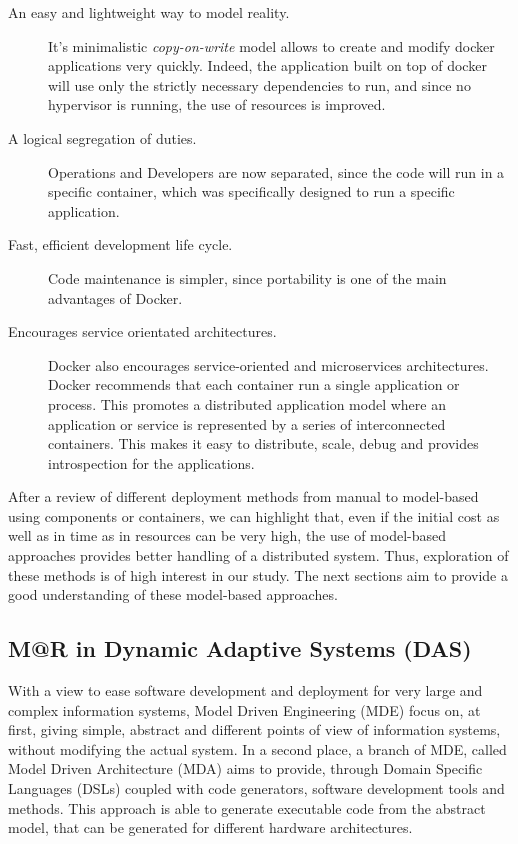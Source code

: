 \begin{description}
	\item[An easy and lightweight way to model reality.] It's minimalistic \textit{copy-on-write} model allows to create and modify docker applications very quickly.
	Indeed, the application built on top of docker will use only the strictly necessary dependencies to run, and since no hypervisor is running, the use of resources is improved.
	\item[A logical segregation of duties.] Operations and Developers are now separated, since the code will run in a specific container, which was specifically designed to run a specific application.
	\item[Fast, efficient development life cycle.] Code maintenance is simpler, since portability is one of the main advantages of Docker.
	\item[Encourages service orientated architectures.] Docker also encourages service-oriented and microservices architectures.
	Docker recommends that each container run a single application or process.
	This promotes a distributed application model where an application or service is represented by a series of interconnected containers.
	This makes it easy to distribute, scale, debug and provides introspection for the applications.
\end{description}

After a review of different deployment methods from manual to model-based using components or containers, we can highlight that, even if the initial cost as well as in time as in resources can be very high, the use of model-based approaches provides better handling of a distributed system.
Thus, exploration of these methods is of high interest in our study.
The next sections aim to provide a good understanding of these model-based approaches.

\subsection{M@R in Dynamic Adaptive Systems (DAS)}
\label{sec:MARinDAS}
With a view to ease software development and deployment for very large and complex information systems, Model Driven Engineering (MDE) focus on, at first, giving simple, abstract and different points of view of information systems, without modifying the actual system. 
In a second place, a branch of MDE, called Model Driven Architecture (MDA) \cite{kleppe2003mda} aims to provide, through Domain Specific Languages (DSLs) coupled with code generators, software development tools and methods.
This approach is able to generate executable code from the abstract model, that can be generated for different hardware architectures.

